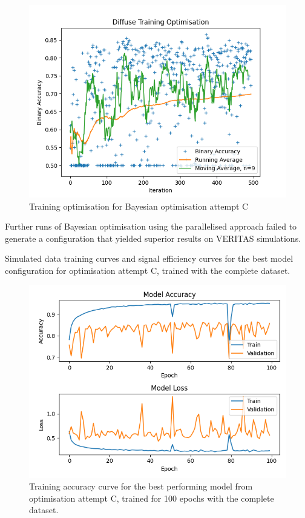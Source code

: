 \begin{figure}[] 
        \centering \includegraphics[width=\columnwidth]{figures/convplot_longmoredata.png}

        \caption{
                \label{fig:convplot_longmoredata} Training optimisation for Bayesian optimisation attempt C
        }
\end{figure}

Further runs of Bayesian optimisation using the parallelised approach failed to generate a configuration that yielded superior results on VERITAS simulations.

Simulated data training curves and signal efficiency curves for the best model configuration for optimisation attempt C, trained with the complete dataset.

\begin{figure}[] 
        \centering \includegraphics[width=\columnwidth]{figures/6vimrcb1485481664trainlog.png}

        \caption{
                \label{fig:6vimrcb1485481664_trainlog} Training accuracy curve for the best performing model from optimisation attempt C, trained for 100 epochs with the complete dataset.
        }
\end{figure}

